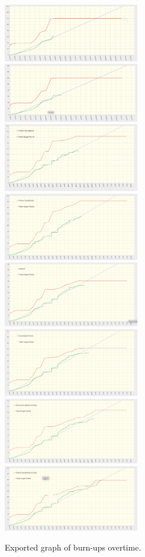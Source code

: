   \begin{figure}[H]
    \centering
    \includegraphics[width=6cm]{assets/burnup/2023-03-03.png}
    \includegraphics[width=6cm]{assets/burnup/2023-03-14.png}
    \includegraphics[width=6cm]{assets/burnup/2023-05-03.png}
    \includegraphics[width=6cm]{assets/burnup/2023-05-10.png}
    \includegraphics[width=6cm]{assets/burnup/2023-05-15.png}
    \includegraphics[width=6cm]{assets/burnup/2023-05-23.png}
    \includegraphics[width=6cm]{assets/burnup/2023-06-03.png}
    \includegraphics[width=6cm]{assets/burnup/2023-06-13.png}
    \caption{Exported graph of burn-ups overtime.}
    \label{fig:scheduleBurnup}
  \end{figure}

